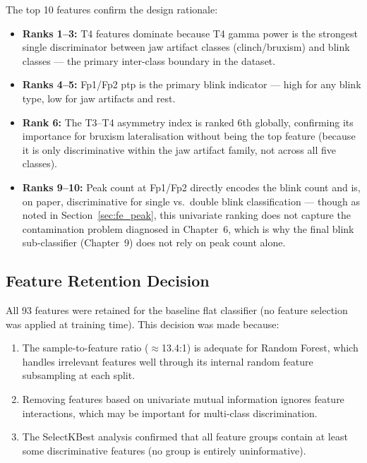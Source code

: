 The top 10 features confirm the design rationale:

\begin{itemize}[leftmargin=*]
    \item \textbf{Ranks 1--3:} T4 features dominate because
    T4 gamma power is the strongest single discriminator
    between jaw artifact classes (clinch/bruxism) and blink
    classes — the primary inter-class boundary in the dataset.
    \item \textbf{Ranks 4--5:} Fp1/Fp2 \acrshort{ptp} is
    the primary blink indicator — high for any blink type,
    low for jaw artifacts and rest.
    \item \textbf{Rank 6:} The T3--T4 asymmetry index is
    ranked 6th globally, confirming its importance for
    bruxism lateralisation without being the top feature
    (because it is only discriminative within the jaw
    artifact family, not across all five classes).
    \item \textbf{Ranks 9--10:} Peak count at Fp1/Fp2
    directly encodes the blink count and is, on paper,
    discriminative for single vs.\ double blink
    classification --- though as noted in
    Section~\ref{sec:fe_peak}, this univariate ranking does
    not capture the contamination problem diagnosed in
    Chapter~6, which is why the final blink sub-classifier
    (Chapter~9) does not rely on peak count alone.
\end{itemize}

\subsection{Feature Retention Decision}

All 93 features were retained for the baseline flat classifier
(no feature selection was applied at training time). This
decision was made because:

\begin{enumerate}[leftmargin=*]
    \item The sample-to-feature ratio ($\approx$13.4:1) is
    adequate for Random Forest, which handles irrelevant
    features well through its internal random feature
    subsampling at each split.
    \item Removing features based on univariate mutual
    information ignores feature interactions, which may
    be important for multi-class discrimination.
    \item The SelectKBest analysis confirmed that all
    feature groups contain at least some discriminative
    features (no group is entirely uninformative).
\end{enumerate}

